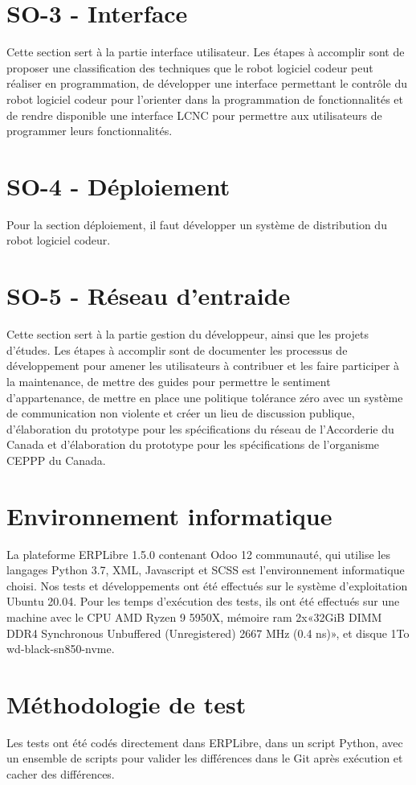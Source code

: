 \section{SO-3 - Interface}
Cette section sert à la partie interface utilisateur. Les étapes à accomplir sont de proposer une classification des techniques que le robot logiciel codeur peut réaliser en programmation, de développer une interface permettant le contrôle du robot logiciel codeur pour l’orienter dans la programmation de fonctionnalités et de rendre disponible une interface LCNC pour permettre aux utilisateurs de programmer leurs fonctionnalités.

\section{SO-4 - Déploiement}
Pour la section déploiement, il faut développer un système de distribution du robot logiciel codeur.

\section{SO-5 - Réseau d’entraide}
Cette section sert à la partie gestion du développeur, ainsi que les projets d'études. Les étapes à accomplir sont de documenter les processus de développement pour amener les utilisateurs à contribuer et les faire participer à la maintenance, de mettre des guides pour permettre le sentiment d'appartenance, de mettre en place une politique tolérance zéro avec un système de communication non violente et créer un lieu de discussion publique, d'élaboration du prototype pour les spécifications du réseau de l’Accorderie du Canada et d'élaboration du prototype pour les spécifications de l’organisme CEPPP du Canada.

\section{Environnement informatique}
La plateforme ERPLibre 1.5.0 contenant Odoo 12 communauté, qui utilise les langages Python 3.7, XML, Javascript et SCSS est l'environnement informatique choisi. Nos tests et développements ont été effectués sur le système d’exploitation Ubuntu 20.04.
Pour les temps d’exécution des tests, ils ont été effectués sur une machine avec le CPU AMD Ryzen 9 5950X, mémoire ram 2x«32GiB DIMM DDR4 Synchronous Unbuffered (Unregistered) 2667 MHz (0.4 ns)», et disque 1To wd-black-sn850-nvme.

\section{Méthodologie de test}
Les tests ont été codés directement dans ERPLibre, dans un script Python, avec un ensemble de scripts pour valider les différences dans le Git après exécution et cacher des différences.

